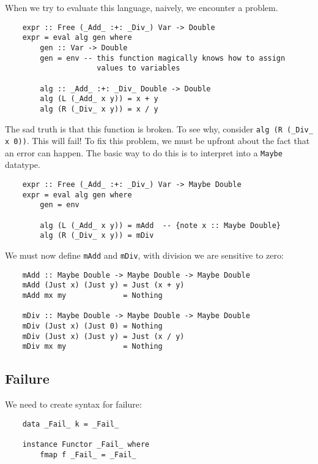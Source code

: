 \documentclass[a4paper,12pt]{article}
\theoremstyle{remark}
\begin{document}
When we try to evaluate this language, naively, we encounter a problem.

\begin{lstlisting}
    expr :: Free (_Add_ :+: _Div_) Var -> Double
    expr = eval alg gen where
        gen :: Var -> Double
        gen = env -- this function magically knows how to assign
                     values to variables

        alg :: _Add_ :+: _Div_ Double -> Double
        alg (L (_Add_ x y)) = x + y
        alg (R (_Div_ x y)) = x / y  \end{lstlisting}

The sad truth is that this function is broken. To see why, consider
\lstinline{alg (R (_Div_ x 0))}. This will fail! To fix this problem, we must be upfront about the
fact that an error can happen. The basic way to do this is to interpret into a
\lstinline{Maybe} datatype.

\begin{lstlisting}
    expr :: Free (_Add_ :+: _Div_) Var -> Maybe Double
    expr = eval alg gen where
        gen = env

        alg (L (_Add_ x y)) = mAdd  -- {note x :: Maybe Double}
        alg (R (_Div_ x y)) = mDiv  \end{lstlisting}

We must now define \lstinline{mAdd} and \lstinline{mDiv}, with division we are sensitive to zero:

\begin{lstlisting}
    mAdd :: Maybe Double -> Maybe Double -> Maybe Double
    mAdd (Just x) (Just y) = Just (x + y)
    mAdd mx my             = Nothing

    mDiv :: Maybe Double -> Maybe Double -> Maybe Double
    mDiv (Just x) (Just 0) = Nothing
    mDiv (Just x) (Just y) = Just (x / y)
    mDiv mx my             = Nothing  \end{lstlisting}

\subsection{Failure}

We need to create syntax for failure:

\begin{lstlisting}
    data _Fail_ k = _Fail_

    instance Functor _Fail_ where
        fmap f _Fail_ = _Fail_  \end{lstlisting}
\end{document}
